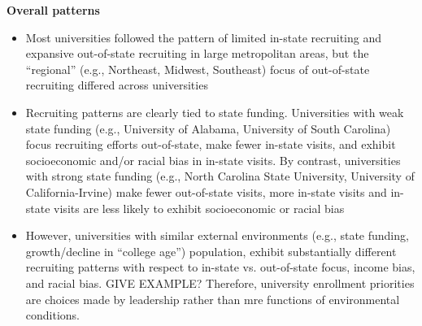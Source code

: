 \documentclass[twoside]{article}
\begin{document}
\begin{color-block}[Findings]
\textbf{Overall patterns}
\begin{itemize}
    \item Most universities followed the pattern of limited in-state recruiting and expansive out-of-state recruiting in large metropolitan areas, but the ``regional'' (e.g., Northeast, Midwest, Southeast) focus of out-of-state recruiting differed across universities
    \item Recruiting patterns are clearly tied to state funding. Universities with weak state funding (e.g., University of Alabama, University of South Carolina) focus recruiting efforts out-of-state, make fewer in-state visits, and exhibit socioeconomic and/or racial bias in in-state visits. By contrast, universities with strong state funding (e.g., North Carolina State University, University of California-Irvine) make fewer out-of-state visits, more in-state visits and in-state visits are less likely to exhibit socioeconomic or racial bias
    \item However, universities with similar external environments (e.g., state funding, growth/decline in ``college age'') population, exhibit substantially different recruiting patterns with respect to in-state vs. out-of-state focus, income bias, and racial bias.  GIVE EXAMPLE? Therefore, university enrollment priorities are choices made by leadership rather than mre functions of environmental conditions.
\end{itemize}  

\end{color-block}
\end{document}
